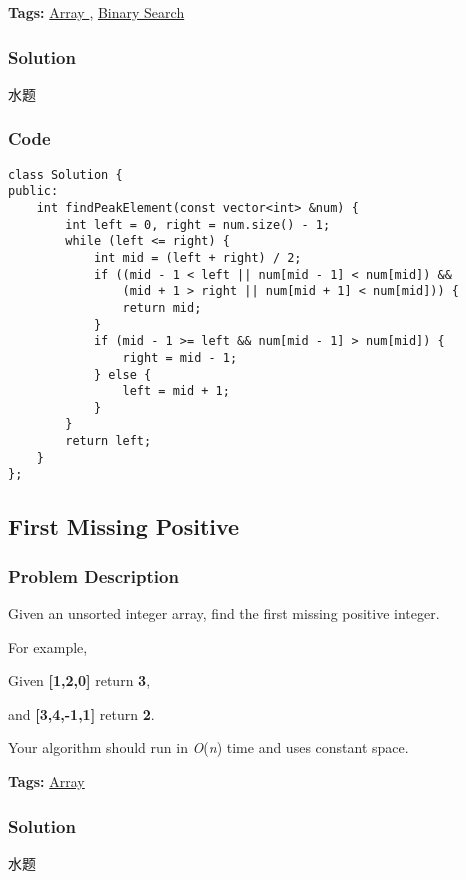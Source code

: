 \documentclass{article}
\begin{document}
\begin{CJK*}{UTF8}{gkai}
\textbf{Tags: }
\hyperref[ Array ]{ Array },  \hyperref[ Binary Search ]{ Binary Search }



\subsubsection*{Solution}
水题

\subsubsection*{Code}
\begin{lstlisting}
class Solution {
public:
    int findPeakElement(const vector<int> &num) {
        int left = 0, right = num.size() - 1;
        while (left <= right) {
            int mid = (left + right) / 2;
            if ((mid - 1 < left || num[mid - 1] < num[mid]) &&
                (mid + 1 > right || num[mid + 1] < num[mid])) {
                return mid;
            }
            if (mid - 1 >= left && num[mid - 1] > num[mid]) {
                right = mid - 1;
            } else {
                left = mid + 1;
            }
        }
        return left;
    }
}; 
\end{lstlisting}


\subsection{ First Missing Positive }
\label{ First Missing Positive }

\subsubsection*{Problem Description}
Given an unsorted integer array, find the first missing positive integer.

For example,


Given \textbf{[1,2,0]} return \textbf{3},


and \textbf{[3,4,-1,1]} return \textbf{2}.

Your algorithm should run in \emph{O}(\emph{n}) time and uses constant space.


\textbf{Tags: }
\hyperref[ Array ]{ Array }



\subsubsection*{Solution}
水题


\end{CJK*}
\end{document}
